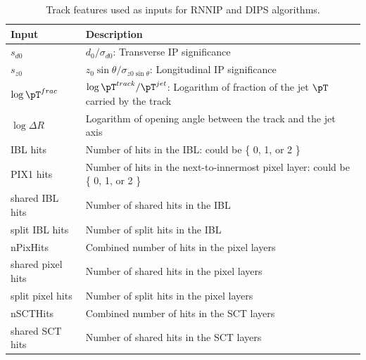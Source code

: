 

\begin{table}[h!]
  \centering
    \begin{tabular}{l | l } %
      \textbf{Input} & \textbf{Description}  \\
      \hline
      \hline
  $s_{d0}$ & $d_0 / \sigma_{d0}$: Transverse IP significance \\
	$s_{z0}$ & $z_0 \sin \theta / \sigma_{z0 \sin \theta}$: Longitudinal IP significance \\
	$\log \pT^{frac}$ & $\log \pT^{track} / \pT^{jet}$: Logarithm of fraction of the jet $\pT$ carried by the track \\
	$\log \Delta R$ & Logarithm of opening angle between the track and the jet axis \\
	IBL hits & Number of hits in the IBL: could be \{ 0, 1, or 2 \} \\
	PIX1 hits & Number of hits in the next-to-innermost pixel layer: could be \{ 0, 1, or 2 \} \\
	shared IBL hits & Number of shared hits in the IBL \\
	split IBL hits & Number of split hits in the IBL \\
	nPixHits & Combined number of  hits in the pixel layers \\
	shared pixel hits & Number of shared hits in the pixel layers \\
	split pixel hits &  Number of split hits in the pixel layers \\
	nSCTHits  & Combined number of hits in the SCT layers \\
	shared SCT hits & Number of shared hits in the SCT layers \\
    \end{tabular}
    \caption{Track features used as inputs for RNNIP and DIPS algorithms.}
    \label{table:inputs}
\end{table}

